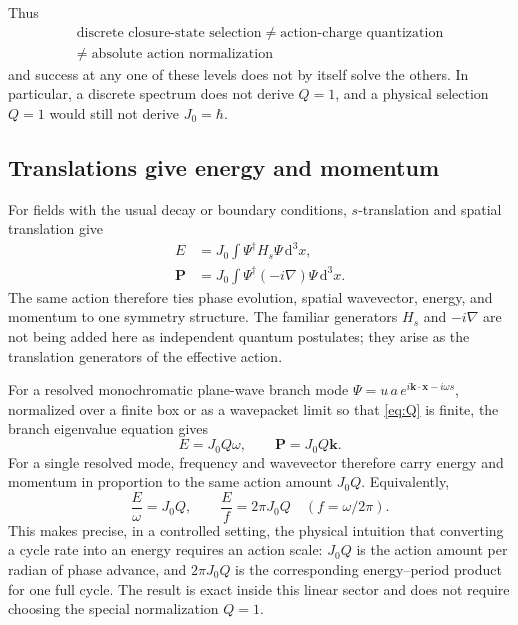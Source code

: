 \documentclass[11pt]{article}
\theoremstyle{definition}
\newcommand{\dd}{\mathrm{d}}
\begin{document}
Thus
\[
\boxed{
\begin{gathered}
\text{discrete closure-state selection}
\;\neq\;
\text{action-charge quantization}
\\[2pt]
\neq\;
\text{absolute action normalization}
\end{gathered}
}
\]
and success at any one of these levels does not by itself solve the others.  In
particular, a discrete spectrum does not derive $Q=1$, and a physical selection
$Q=1$ would still not derive $J_0=\hbar$.

\subsection{Translations give energy and momentum}

For fields with the usual decay or boundary conditions, $s$-translation and spatial
translation give
\begin{align}
 E&=J_0\int\Psi^\dagger H_s\Psi\,\dd^3x,
 \label{eq:Echarge}\\
 \mathbf P&=J_0\int\Psi^\dagger(-i\nabla)\Psi\,\dd^3x.
 \label{eq:Pcharge}
\end{align}
The same action therefore ties phase evolution, spatial wavevector, energy, and momentum to
one symmetry structure.  The familiar generators $H_s$ and $-i\nabla$ are not being added here
as independent quantum postulates; they arise as the translation generators of the effective
action.

For a resolved monochromatic plane-wave branch mode
$\Psi=u\,a\,e^{i\mathbf k\cdot\mathbf x-i\omega s}$, normalized over a finite box or as a
wavepacket limit so that \eqref{eq:Q} is finite, the branch eigenvalue equation gives
\begin{equation}
 \boxed{E=J_0Q\omega,
 \qquad
 \mathbf P=J_0Q\mathbf k.}
 \label{eq:modeEP}
\end{equation}
For a single resolved mode, frequency and wavevector therefore carry energy and momentum in
proportion to the same action amount $J_0Q$.  Equivalently,
\[
 \frac{E}{\omega}=J_0Q,
 \qquad
 \frac{E}{f}=2\pi J_0Q
 \quad (f=\omega/2\pi).
\]
This makes precise, in a controlled setting, the physical intuition that converting a cycle
rate into an energy requires an action scale: $J_0Q$ is the action amount per radian of phase
advance, and $2\pi J_0Q$ is the corresponding energy--period product for one full cycle.  The
result is exact inside this linear sector and does not require choosing the special
normalization $Q=1$.
\end{document}
